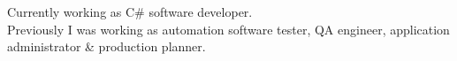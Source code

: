 \documentclass[9pt]{developercv}
\begin{document}
\vspace{0.5cm}



\begin{minipage}[t]{0.4\textwidth} %
	\vspace{-\baselineskip} %
	
	Currently working as C\# software developer. \\ Previously I was working as automation software tester, QA engineer, application administrator \& production planner. \\ 
\end{minipage}
\hfill %
\begin{minipage}[t]{0.5\textwidth} %
	\vspace{-\baselineskip} %
	\begin{barchart}{5.5}
	\end{barchart}
\end{minipage}



\end{document}

